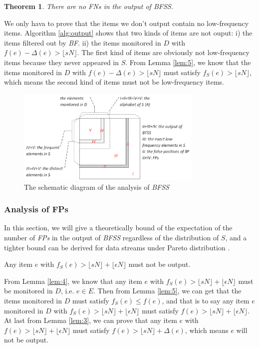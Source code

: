 \documentclass[conference]{IEEEtran}
\begin{document}
\newtheorem{theorem}{Theorem}
\begin{theorem}\label{thm:1}
	There are no \emph{FNs} in the output of \emph{BFSS}.
\end{theorem}

\begin{IEEEproof}
We only hava to prove that the items we don't output contain no low-frequency items. Algorithm \ref{alg:output} shows that two kinds of items are not ouput: i) the items filtered out by \emph{BF}. ii) the items monitored in $D$ with $f(e)-\Delta(e)>\lfloor sN\rfloor$. The first kind of items are obviously not low-frequency items because they never appeared in $S$. From Lemma \ref{lem:5}, we know that the items monitored in $D$ with $f(e)-\Delta(e)>\lfloor sN\rfloor$ must satisfy $f_S(e)>\lfloor sN\rfloor$, which means the second kind of items must not be low-frequency items.
\end{IEEEproof}

\begin{figure}
	\centering
	\includegraphics[width=3.5in]{png/bfss.png}
	\caption{The schematic diagram of the analysis of \emph{BFSS}}
	\label{fig:bfss}
\end{figure}

\subsubsection{\textbf{Analysis of FPs}}
In this section, we will give a theoretically bound of the expectation of the number of \emph{FPs} in the output of \emph{BFSS} regardless of the distribution of $S$, and a tighter bound can be derived for data streams under Pareto distribution \cite{IEEEexample:pareto}.

\begin{lemma}\label{lem:6}
Any item $e$ with $f_S(e)>\lfloor sN\rfloor+\lfloor\epsilon N\rfloor$ must not be output.
\end{lemma}

\begin{IEEEproof}
From Lemma \ref{lem:4}, we know that any item $e$ with $f_S(e)>\lfloor sN\rfloor+\lfloor\epsilon N\rfloor$ must be monitored in $D$, i.e. $e\in E$. Then from Lemma \ref{lem:5}, we can get that the items monitored in $D$ must satisfy $f_S(e)\leq f(e)$, and that is to say any item $e$ monitored in $D$ with $f_S(e)>\lfloor sN\rfloor+\lfloor\epsilon N\rfloor$ must satisfy $f(e)>\lfloor sN\rfloor+\lfloor\epsilon N\rfloor$. At last from Lemma \ref{lem:3}, we can prove that any item $e$ with $f(e)>\lfloor sN\rfloor+\lfloor\epsilon N\rfloor$ must satisfy $f(e)>\lfloor sN\rfloor+\Delta(e)$, which means $e$ will not be output.
\end{IEEEproof}
\end{document}
